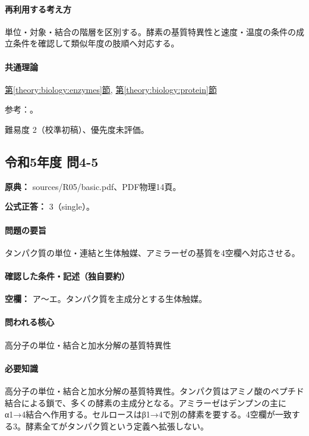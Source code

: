\paragraph{再利用する考え方} 単位・対象・結合の階層を区別する。酵素の基質特異性と速度・温度の条件の成立条件を確認して類似年度の肢順へ対応する。

\paragraph{共通理論} \hyperref[theory:biology:enzymes]{第\ref*{theory:biology:enzymes}節}, \hyperref[theory:biology:protein]{第\ref*{theory:biology:protein}節}

\par 参考：\cite{iubmb_lipase,hyper_amylase}。

\par 難易度 2（校準初稿）、優先度未評価。

\subsection{令和5年度 問4-5}
\label{q:r05-reg-basic-4-5}

\noindent\textbf{原典：} sources/R05/basic.pdf、PDF物理14頁。

\textbf{公式正答：} 3（single）。

\paragraph{問題の要旨} タンパク質の単位・連結と生体触媒、アミラーゼの基質を4空欄へ対応させる。

\paragraph{確認した条件・記述（独自要約）}\mbox{}\par

\noindent\textbf{空欄：} ア〜エ。タンパク質を主成分とする生体触媒。\par

\paragraph{問われる核心} 高分子の単位・結合と加水分解の基質特異性

\paragraph{必要知識} 高分子の単位・結合と加水分解の基質特異性。タンパク質はアミノ酸のペプチド結合による鎖で、多くの酵素の主成分となる。アミラーゼはデンプンの主にα1→4結合へ作用する。セルロースはβ1→4で別の酵素を要する。4空欄が一致する3。酵素全てがタンパク質という定義へ拡張しない。

